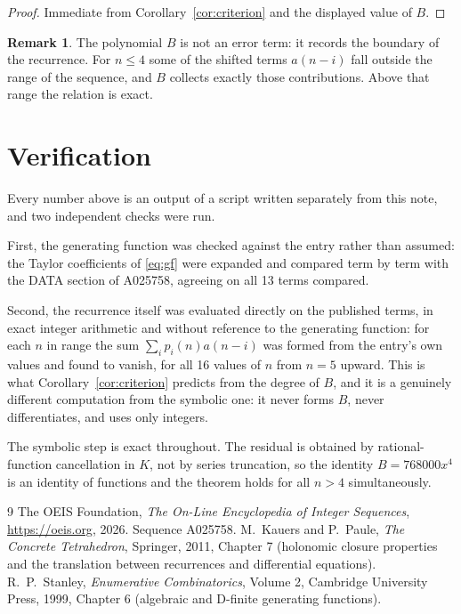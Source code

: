 \documentclass[11pt,a4paper]{article}
\theoremstyle{plain}
\theoremstyle{definition}
\newtheorem{remark}[theorem]{Remark}
\begin{document}
\begin{proof}
Immediate from Corollary~\ref{cor:criterion} and the displayed value of $B$.
\end{proof}

\begin{remark}
The polynomial $B$ is not an error term: it records the boundary of the recurrence. For
$n\le4$ some of the shifted terms $a(n-i)$ fall outside the range of the sequence,
and $B$ collects exactly those contributions. Above that range the relation is exact.
\end{remark}

\section{Verification}

Every number above is an output of a script written separately from this note, and two
independent checks were run.

First, the generating function was checked against the entry rather than assumed: the
Taylor coefficients of \eqref{eq:gf} were expanded and compared term by term with the DATA
section of A025758, agreeing on all 13 terms compared.

Second, the recurrence itself was evaluated directly on the published terms, in exact
integer arithmetic and without reference to the generating function: for each $n$ in range
the sum $\sum_{i}p_{i}(n)a(n-i)$ was formed from the entry's own values and found to
vanish, for all 16 values of $n$ from $n=5$ upward. This is what
Corollary~\ref{cor:criterion} predicts from the degree of $B$, and it is a genuinely
different computation from the symbolic one: it never forms $B$, never differentiates, and
uses only integers.

The symbolic step is exact throughout. The residual is obtained by rational-function
cancellation in $K$, not by series truncation, so the identity $B=768000 x^{4}$ is an
identity of functions and the theorem holds for all $n>4$ simultaneously.

\begin{thebibliography}{9}
 The OEIS Foundation, \emph{The On-Line Encyclopedia of Integer Sequences},
\url{https://oeis.org}, 2026. Sequence A025758.
 M.~Kauers and P.~Paule, \emph{The Concrete Tetrahedron}, Springer, 2011,
Chapter 7 (holonomic closure properties and the translation between recurrences and
differential equations).
 R.~P.~Stanley, \emph{Enumerative Combinatorics}, Volume 2, Cambridge
University Press, 1999, Chapter 6 (algebraic and D-finite generating functions).
\end{thebibliography}
\end{document}
